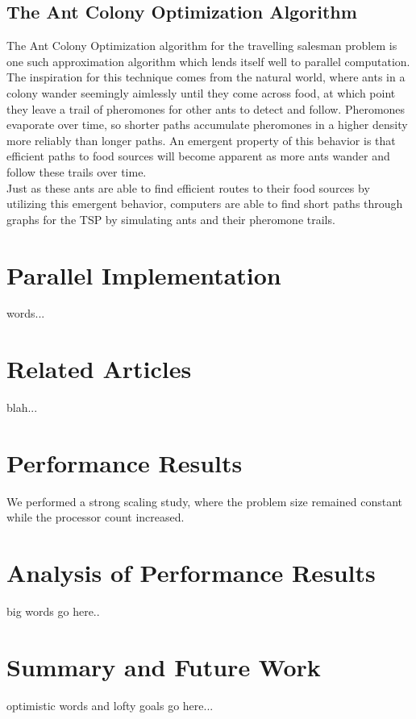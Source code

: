 \documentclass[twocolumn]{article}
\begin{document}
\subsection{The Ant Colony Optimization Algorithm}

The Ant Colony Optimization algorithm for the travelling salesman problem is one
such approximation algorithm which lends itself well to parallel computation.
The inspiration for this technique comes from the natural world, where ants in a
colony wander seemingly aimlessly until they come across food, at which point
they leave a trail of pheromones for other ants to detect and follow. Pheromones
evaporate over time, so shorter paths accumulate pheromones in a higher density 
more reliably than longer paths. An emergent property of this behavior is that 
efficient paths to food sources will become apparent as more ants wander and 
follow these trails over time.\\

Just as these ants are able to find efficient routes to their food sources by
utilizing this emergent behavior, computers are able to find short paths through
graphs for the TSP by simulating ants and their pheromone trails.


\section{Parallel Implementation}

words...\\


\section{Related Articles}

blah...\\


\section{Performance Results}

We performed a strong scaling study, where the problem size remained constant
while the processor count increased.\\


\section{Analysis of Performance Results}

big words go here..\\


\section{Summary and Future Work}

optimistic words and lofty goals go here...\\
\end{document}
